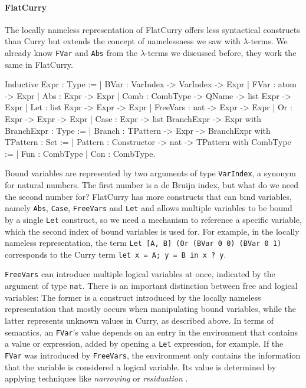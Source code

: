 \documentclass[a4paper, 11pt, fleqn]{scrreprt}
\newcommand{\coqinline}[1]{\texttt{#1}}
\begin{document}
	\paragraph{FlatCurry}
	The locally nameless representation of FlatCurry offers less syntactical constructs than Curry but extends the concept of namelessness we saw with $\lambda$-terms. We already know \coqinline{FVar} and \coqinline{Abs} from the $\lambda$-terms we discussed before, they work the same in FlatCurry.
	\begin{coqcode}
Inductive Expr : Type :=
| BVar : VarIndex -> VarIndex -> Expr
| FVar : atom -> Expr
| Abs  : Expr -> Expr
| Comb : CombType -> QName -> list Expr -> Expr
| Let  : list Expr -> Expr -> Expr
| FreeVars : nat -> Expr -> Expr
| Or : Expr -> Expr -> Expr
| Case : Expr -> list BranchExpr -> Expr
with BranchExpr : Type :=
     | Branch : TPattern -> Expr -> BranchExpr
with TPattern : Set :=
     | Pattern : Constructor -> nat -> TPattern
with CombType :=
     | Fun : CombType
     | Con : CombType.
	\end{coqcode}
	Bound variables are represented by two arguments of type \coqinline{VarIndex}, a synonym for natural numbers. The first number is a de Bruijn index, but what do we need the second number for? FlatCurry has more constructs that can bind variables, namely \coqinline{Abs}, \coqinline{Case}, \coqinline{FreeVars} and \coqinline{Let} and allows multiple variables to be bound by a single \coqinline{Let} construct, so we need a mechanism to reference a specific variable, which the second index of bound variables is used for. For example, in the locally nameless representation, the term \coqinline{Let [A, B] (Or (BVar 0 0) (BVar 0 1)} corresponds to the Curry term \coqinline{let x = A; y = B in x ? y}. 
	\par
	\coqinline{FreeVars} can introduce multiple logical variables at once, indicated by the argument of type \coqinline{nat}. There is an important distinction between free and logical variables: The former is a construct introduced by the locally nameless representation that mostly occurs when manipulating bound variables, while the latter represents unknown values in Curry, as described above. In terms of semantics, an \coqinline{FVar}'s value depends on an entry in the environment that contains a value or expression, added by opening a \coqinline{Let} expression, for example. If the \coqinline{FVar} was introduced by \coqinline{FreeVars}, the environment only contains the information that the variable is considered a logical variable. Its value is determined by applying techniques like \textit{narrowing} or \textit{residuation} \citep{Hanus13}.
\end{document}
